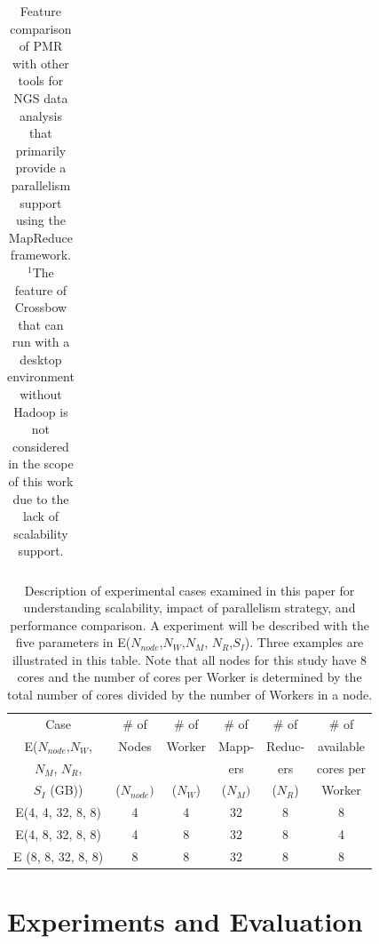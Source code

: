 \documentclass{acm_proc_article-sp}
\begin{document}
\begin{center}
\begin{table}[ht]
{\begin{tabular}{|l|l|c|c|c|c|c|c|}
\hline
\end{tabular}}
\hfill{}
\caption{Feature comparison of PMR with other tools for NGS data analysis that primarily provide a parallelism support using the MapReduce framework.  $^{1}${The feature of Crossbow that can run with a desktop environment without Hadoop is not considered in the scope of this work due to the lack of scalability support.} }
 \label{table:mr-comparison}
\end{table}
\end{center}


\begin{table}
\small
 \begin{tabular}{|c|c|c|c|c|c|} 
 \hline 

Case & \# of  & \# of &  \# of & \# of & \# of  \\
E($N_{node}$,$N_W$,  & Nodes & Worker   & Mapp- & Reduc- & available  \\
$N_M$, $N_R$,  & &  & ers & ers & cores per\\
$S_I$ (GB)) & ($N_{node})$& ($N_W$) & ($N_M) $ & ($N_R$) & Worker \\
 \hline
E(4, 4, 32, 8, 8) &4 &  4 & 32  & 8 & 8 \\
E(4, 8, 32, 8, 8) & 4 & 8 & 32 & 8 & 4 \\
E (8, 8, 32, 8, 8) & 8 & 8 & 32 & 8 & 8 \\ 
 \hline
 \end{tabular}

 \caption{Description of experimental cases examined in this paper for understanding scalability, impact of parallelism strategy, and performance comparison.  A experiment will be described with the five parameters in E($N_{node}$,$N_W$,$N_M$, $N_R$,$S_I$).  Three examples are illustrated in this table.  Note that all nodes for this study have 8 cores and the number of cores per Worker is determined by the total number of cores divided by the number of Workers in a node.}
    \label{table:exp-description} 
\end{table}



\section{Experiments and Evaluation}\label{sec:results}
\end{document}
